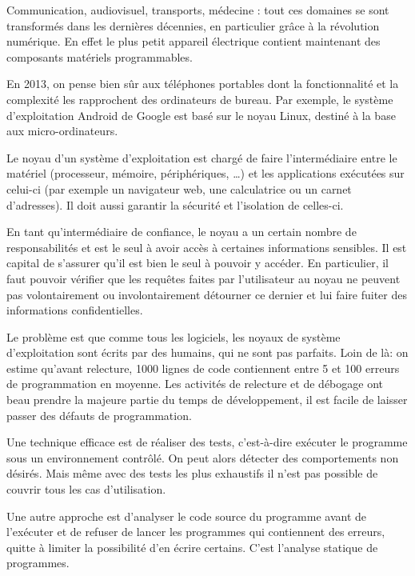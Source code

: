 Communication,
audiovisuel,
transports,
médecine :
tout ces domaines se sont transformés dans les dernières décennies,
en particulier grâce à la révolution numérique.
En effet le plus petit appareil électrique contient maintenant des composants
matériels programmables.


En 2013, on pense bien sûr aux téléphones portables dont la fonctionnalité et la
complexité les rapprochent des ordinateurs de bureau. Par exemple, le système
d'exploitation Android de Google est basé sur le noyau Linux, destiné à la base
aux micro-ordinateurs.

Le noyau d'un système d'exploitation est chargé de faire l'intermédiaire entre
le matériel (processeur, mémoire, périphériques, …) et les applications
exécutées sur celui-ci (par exemple un navigateur web, une calculatrice ou un
carnet d'adresses). Il doit aussi garantir la sécurité et l'isolation de
celles-ci.

En tant qu'intermédiaire de confiance, le noyau a un certain nombre de
responsabilités et est le seul à avoir accès à certaines informations sensibles.
Il est capital de s'assurer qu'il est bien le seul à pouvoir y accéder. En
particulier, il faut pouvoir vérifier que les requêtes faites par l'utilisateur
au noyau ne peuvent pas volontairement ou involontairement détourner ce dernier
et lui faire fuiter des informations confidentielles.

Le problème est que comme tous les logiciels, les noyaux de système
d'exploitation sont écrits par des humains, qui ne sont pas parfaits. Loin de
là: on estime qu'avant relecture, 1000 lignes de code contiennent entre 5 et 100
erreurs de programmation en moyenne.
Les activités de relecture et de
débogage ont beau prendre la majeure partie du temps de développement, il est
facile de laisser passer des défauts de programmation.

Une technique efficace est de réaliser des tests, c'est-à-dire exécuter le
programme sous un environnement contrôlé. On peut alors détecter des
comportements non désirés. Mais même avec des tests les plus exhaustifs il n'est
pas possible de couvrir tous les cas d'utilisation.

Une autre approche est d'analyser le code source du programme avant de
l'exécuter et de refuser de lancer les programmes qui contiennent des erreurs,
quitte à limiter la possibilité d'en écrire certains. C'est l'analyse statique
de programmes.


